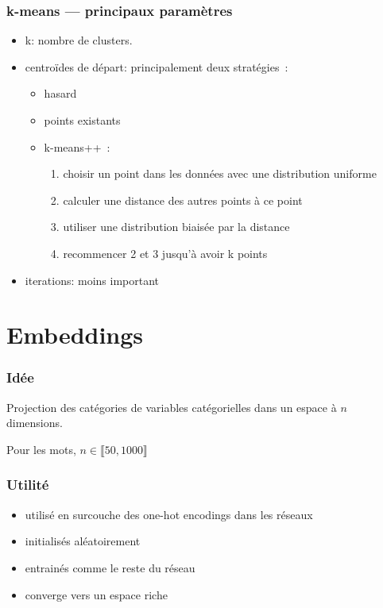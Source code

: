 \documentclass{formation}
\begin{document}
\begin{frame}
  \frametitle{k-means — principaux paramètres}

  \begin{itemize}[<+->]
  \item k: nombre de clusters.
  \item centroïdes de départ: principalement deux stratégies :
    \begin{itemize}
    \item hasard
    \item points existants
    \item k-means++ :
      \begin{enumerate}
      \item choisir un point dans les données avec une distribution uniforme
      \item calculer une distance des autres points à ce point
      \item utiliser une distribution biaisée par la distance
      \item recommencer 2 et 3 jusqu'à avoir k points
      \end{enumerate}
    \end{itemize}

  \item iterations: moins important
  \end{itemize}
\end{frame}

\section{Embeddings}

\begin{frame}
  \frametitle{Idée}
  Projection des catégories de variables catégorielles dans un espace
  à $n$ dimensions.

  Pour les mots, $n \in \llbracket 50, 1000 \rrbracket$
\end{frame}


\begin{frame}
  \frametitle{Utilité}
  \begin{itemize}
  \item utilisé en surcouche des one-hot encodings dans les réseaux
  \item initialisés aléatoirement
  \item entrainés comme le reste du réseau
  \item converge vers un espace riche
  \end{itemize}
\end{frame}
\end{document}
